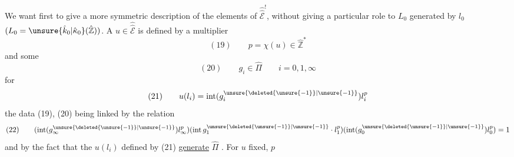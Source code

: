 We want first to give a more symmetric description of the elements of $\widehat{\widehat{\mathcal E}}^!$, without giving a particular role to $L_0$ generated by $l_0$ $(L_0=\unsure{\hat k_0|\hat\kappa_0}(\hat{\mathbb Z}))$. A $u\in\widehat{\widehat{\mathcal E}}$ is  defined by a multiplier
\[
(19)\qquad p=\chi(u)\in\hat{\mathbb Z}^{*}
\]
and some
\[
(20)\qquad g_i\in\hat\Pi\qquad i=0,1,\infty
\]
for
\[
(21)\qquad u(l_i)=\operatorname{int}(g_i^{\unsure{\deleted{\unsure{-1}}|\unsure{-1}}})l_i^p
\]
the data (19), (20) being linked by the relation
\[
(22)\qquad(\operatorname{int}(g_\infty^{\unsure{\deleted{\unsure{-1}}|\unsure{-1}}})l_\infty^p)
(\operatorname{int}g_1^{\unsure{\deleted{\unsure{-1}}|\unsure{-1}}}\cdot l_1^p)
(\operatorname{int}(g_0^{\unsure{\deleted{\unsure{-1}}|\unsure{-1}}})l_0^p)=1
\]
and by the fact that the $u(l_i)$ defined by (21) \uline{generate} $\hat\Pi$ . For $u$ fixed, $p$
